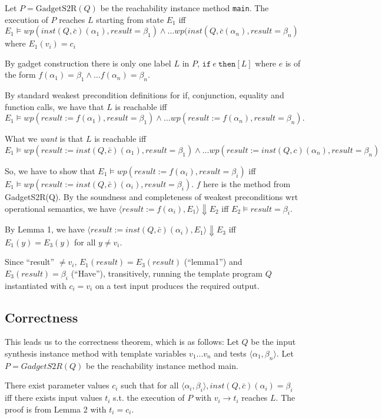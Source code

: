 \documentclass[11pt]{article}
\begin{document}
Let $P = \mbox{GadgetS2R}(Q)$ be the reachability instance method \texttt{main}.
The execution of $P$ reaches $L$ starting from state $E_1$ iff  $E_1
\vDash wp(inst(Q, \bar{c})(\alpha_1), result = \beta_1) \wedge \ldots
wp(inst(Q,\bar{c}(\alpha_n), result = \beta_n)$ where $E_1(v_i) =
c_i$


By gadget construction there is only one label $L$ in $P$, $\mathtt{if}~ e~
\mathtt{then} [L]$ where $e$ is of the form $f(\alpha_1) = \beta_1 \wedge \ldots
f(\alpha_n) = \beta_n$.

By standard weakest precondition definitions for if, conjunction, equality and
function calls, we have that $L$ is reachable iff $E_1 \vDash  wp(result :=
f(\alpha_1), result = \beta_1) \wedge \ldots wp(result := f(\alpha_n), result =
\beta_n).$

What we \emph{want} is that $L$ is reachable iff $E_1 \vDash wp(
result := inst(Q, \bar{c})(\alpha_1), result = \beta_1) \wedge \ldots wp(result := inst(Q,
c)(\alpha_n), result = \beta_n)$

So, we have to show that $E_1 \vDash wp(result := f(\alpha_i), result =
\beta_i)$ iff $E_1 \vDash wp(result := inst(Q, \bar{c})(\alpha_i), result =
\beta_i)$.  $f$ here is the method from GadgetS2R(Q).  By the soundness and
completeness of weakest preconditions wrt operational semantics, we have
$\langle result := f(\alpha_i), E_1\rangle \Downarrow E_2$ iff $E_2 \vDash
result = \beta_i$.  

By Lemma 1, we have $\langle result := inst(Q, \bar{c})(\alpha_i) ,
E_1 \rangle \Downarrow E_3$ iff $E_1(y)= E_3(y)$ for all $y \neq
v_i$.

Since ``result'' $\neq v_i$, $E_1(result) = E_3(result)$ (``lemma1'') and
$E_3(result) = \beta_i$ (``Have''), transitively, running the template program
$Q$ instantiated with $c_i = v_i$ on a test input produces the required output.

\subsection{Correctness}

This leads us to the correctness theorem, which is as follows: Let $Q$ be the
input synthesis instance method with template variables $v_1 ... v_n$ and tests
$\langle\alpha_1, \beta_n\rangle$. 
Let $P = GadgetS2R(Q)$ be the reachability instance method main.

There exist parameter values $c_i$ such that for all
$\langle\alpha_i,\beta_i\rangle, inst(Q,\bar{c})(\alpha_i) = \beta_i$ iff there exists input
values $t_i$ s.t. the execution of $P$ with $v_i \rightarrow t_i$ reaches $L$.
The proof is from Lemma 2 with $t_i = c_i$. 
\end{document}
